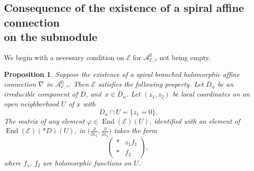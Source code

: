 \documentclass[10pt,a4paper]{amsart}
\newcommand{\der}[2]{\frac{\partial #1}{\partial#2}}
\numberwithin{equation}{section}
\newtheorem{Proposition}[Theorem]{Proposition}
 { \theoremstyle{definition}
\newtheorem{Definition}[Theorem]{Definition}
\newtheorem{Note}[Theorem]{Note}
\newtheorem{Exemple}[Theorem]{Example}
\newtheorem{Remark}[Theorem]{Remark} }
\begin{document}
\subsection[Consequence of the existence of a spiral affine connection on the submodule]{Consequence of the existence of a spiral affine connection\\ on the submodule}
We begin with a necessary condition on $\mathcal{E}$ for $\mathcal{A}^0_{\mathcal{E},\tau}$ not being empty.
\begin{Proposition}\label{necessarynottau} Suppose the existence of a spiral branched holomorphic affine connection $\nabla$ in $\mathcal{A}^0_{\mathcal{E},\tau}$. Then $\mathcal{E}$ satisfies the following property. Let $D_\alpha$ be an irreducible component of $D$, and~$x\in D_\alpha$. Let $(z_1,z_2)$ be local coordinates on an open neighborhood $U$ of $x$ with
\[D_\alpha \cap U=\{z_1=0\}.\]
The matrix of any element $\varphi \in \operatorname{End}(\mathcal{E})(U)$, identified with an element of $\operatorname{End}(\mathcal{E})(* D)(U)$, in $\big(\der{}{z_1},\der{}{z_2}\big)$ takes the form
\begin{equation}\label{formnottau} \begin{pmatrix} * & z_1 f_1 \\ * & f_2 \end{pmatrix}, \end{equation} where $f_1$, $f_2$ are holomorphic functions on $U$.\end{Proposition}
\end{document}
